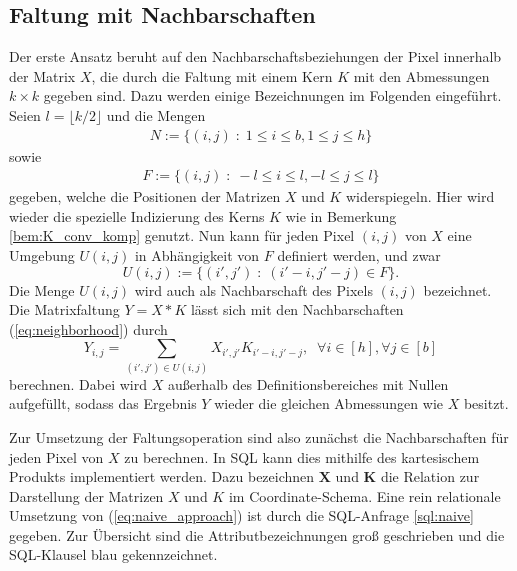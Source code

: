 \subsection{Faltung mit Nachbarschaften}
\label{abs:naive_app}
Der erste Ansatz beruht auf den Nachbarschaftsbeziehungen der Pixel innerhalb der Matrix $X$, die durch die Faltung mit einem Kern $K$ mit den Abmessungen $k \times k$ gegeben sind. Dazu werden einige Bezeichnungen im Folgenden eingeführt. Seien $l=\lfloor k/2 \rfloor$ und die Mengen
\begin{align*}
    N:=\{(i,j) \; :\; 1 \leq i \leq b, 1 \leq j \leq h \}
\end{align*} 
sowie
\begin{align*}
    F:=\{(i,j) \; :\; -l \leq i \leq l, -l \leq j \leq l \}
\end{align*} 
gegeben, welche die Positionen der Matrizen $X$ und $K$ widerspiegeln. Hier wird wieder die spezielle Indizierung des Kerns $K$ wie in Bemerkung \ref{bem:K_conv_komp} genutzt. Nun kann für jeden Pixel $(i,j)$ von $X$ eine Umgebung $U(i,j)$  in Abhängigkeit von $F$ definiert werden, und zwar
\begin{equation}
    \label{eq:neighborhood}
    U(i,j):=\{(i', j') \; : \; (i'-i, j'-j) \in F \}.
\end{equation}
Die Menge $U(i,j)$ wird auch als Nachbarschaft des Pixels $(i,j)$ bezeichnet.
Die Matrixfaltung $Y= X \ast K$ lässt sich mit den Nachbarschaften (\ref{eq:neighborhood}) durch
\begin{equation}
    \label{eq:naive_approach}
    Y_{i,j}=\sum_{(i',j') \in U(i,j)} X_{i', j'} K_{i'-i, j'-j}, \; \; \forall i \in [h], \forall j \in [b]
\end{equation}
berechnen. Dabei wird $X$ außerhalb des Definitionsbereiches mit Nullen aufgefüllt, sodass das Ergebnis $Y$ wieder die gleichen Abmessungen wie $X$ besitzt.

Zur Umsetzung der Faltungsoperation sind also zunächst die Nachbarschaften für jeden Pixel von $X$ zu berechnen. In SQL kann dies mithilfe des kartesischem Produkts implementiert werden. Dazu bezeichnen $\mathbf{X}$ und $\mathbf{K}$ die Relation zur Darstellung der Matrizen $X$ und $K$ im Coordinate-Schema. Eine rein relationale Umsetzung von (\ref{eq:naive_approach}) ist durch die SQL-Anfrage \ref{sql:naive} gegeben. Zur Übersicht sind die Attributbezeichnungen groß geschrieben und die SQL-Klausel blau gekennzeichnet. 



